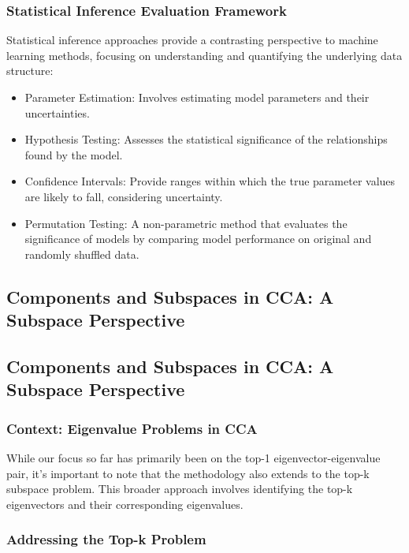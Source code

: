 \subsubsection{Statistical Inference Evaluation Framework}

Statistical inference approaches provide a contrasting perspective to machine learning methods, focusing on understanding and quantifying the underlying data structure:

\begin{itemize}
\item Parameter Estimation: Involves estimating model parameters and their uncertainties.
\item Hypothesis Testing: Assesses the statistical significance of the relationships found by the model.
\item Confidence Intervals: Provide ranges within which the true parameter values are likely to fall, considering uncertainty.
\item Permutation Testing: A non-parametric method that evaluates the significance of models by comparing model performance on original and randomly shuffled data.
\end{itemize}

\subsection{Components and Subspaces in CCA: A Subspace Perspective}

\subsection{Components and Subspaces in CCA: A Subspace Perspective}

\subsubsection{Context: Eigenvalue Problems in CCA}\label{subsec:orthogonality}

While our focus so far has primarily been on the top-1 eigenvector-eigenvalue pair, it's important to note that the methodology also extends to the top-k subspace problem. This broader approach involves identifying the top-k eigenvectors and their corresponding eigenvalues.

\subsubsection{Addressing the Top-k Problem}


